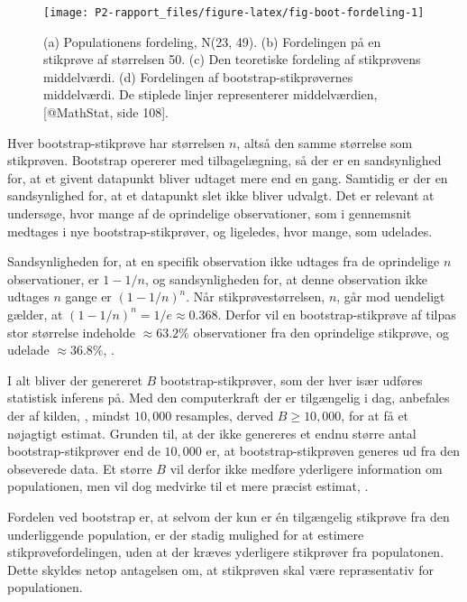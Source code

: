 \documentclass[
]{book}
\theoremstyle{definition}
\theoremstyle{definition}
\theoremstyle{definition}
\theoremstyle{remark}
\begin{document}
\begin{figure}

{\centering \texttt{[image: P2-rapport\_files/figure-latex/fig-boot-fordeling-1]} 

}

\caption{(a) Populationens fordeling,  N(23, 49). (b) Fordelingen på en stikprøve af størrelsen 50. (c) Den teoretiske fordeling af stikprøvens middelværdi. (d) Fordelingen af bootstrap-stikprøvernes middelværdi. De stiplede linjer representerer middelværdien, [@MathStat, side 108].}\label{fig:fig-boot-fordeling}
\end{figure}

Hver bootstrap-stikprøve har størrelsen \(n\), altså den samme størrelse som stikprøven. Bootstrap opererer med tilbagelægning, så der er en sandsynlighed for, at et givent datapunkt bliver udtaget mere end en gang. Samtidig er der en sandsynlighed for, at et datapunkt slet ikke bliver udvalgt. Det er relevant at undersøge, hvor mange af de oprindelige observationer, som i gennemsnit medtages i nye bootstrap-stikprøver, og ligeledes, hvor mange, som udelades.

Sandsynligheden for, at en specifik observation ikke udtages fra de oprindelige \(n\) observationer, er \(1-1/n\), og sandsynligheden for, at denne observation ikke udtages \(n\) gange er \((1-1/n)^n\). Når stikprøvestørrelsen, \(n\), går mod uendeligt gælder, at \((1-1/n)^n = 1/e \approx 0.368\). Derfor vil en bootstrap-stikprøve af tilpas stor størrelse indeholde \(\approx 63.2\%\) observationer fra den oprindelige stikprøve, og udelade \(\approx 36.8\%\), \citep{SAS}.

I alt bliver der genereret \(B\) bootstrap-stikprøver, som der hver især udføres statistisk inferens på. Med den computerkraft der er tilgængelig i dag, anbefales der af kilden, \citep{BootYouTube1}, mindst \(10,000\) resamples, derved \(B \geq 10,000\), for at få et nøjagtigt estimat. Grunden til, at der ikke genereres et endnu større antal bootstrap-stikprøver end de \(10,000\) er, at bootstrap-stikprøven generes ud fra den obseverede data. Et større \(B\) vil derfor ikke medføre yderligere information om populationen, men vil dog medvirke til et mere præcist estimat, \citep[10:20]{BootYouTube1}.

Fordelen ved bootstrap er, at selvom der kun er én tilgængelig stikprøve fra den underliggende population, er der stadig mulighed for at estimere stikprøvefordelingen, uden at der kræves yderligere stikprøver fra populatonen. Dette skyldes netop antagelsen om, at stikprøven skal være repræsentativ for populationen.
\end{document}

